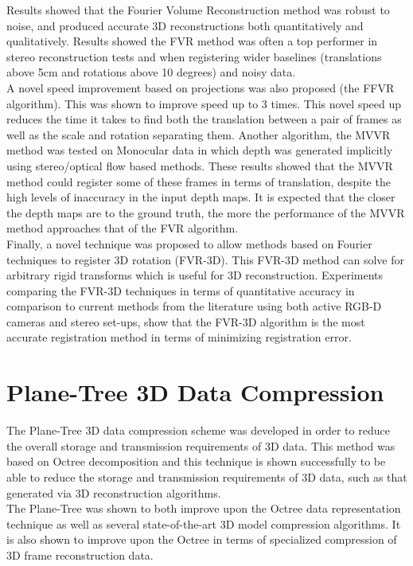 Results showed that the Fourier Volume Reconstruction method was robust to noise, and produced accurate 3D reconstructions both quantitatively and qualitatively. Results showed the FVR method was often a top performer in stereo reconstruction tests and when registering wider baselines (translations above 5cm and rotations above 10 degrees) and noisy data. \\

A novel speed improvement based on projections was also proposed (the FFVR algorithm). This was shown to improve speed up to 3 times. This novel speed up reduces the time it takes to find both the translation between a pair of frames as well as the scale and rotation separating them. Another algorithm, the MVVR method was tested on Monocular data in which depth was generated implicitly using stereo/optical flow based methods. These results showed that the MVVR method could register some of these frames in terms of translation, despite the high levels of inaccuracy in the input depth maps. It is expected that the closer the depth maps are to the ground truth, the more the performance of the MVVR method approaches that of the FVR algorithm. \\

Finally, a novel technique was proposed to allow methods based on Fourier techniques to register 3D rotation (FVR-3D). This FVR-3D method can solve for arbitrary rigid transforms which is useful for 3D reconstruction. Experiments comparing the FVR-3D techniques in terms of quantitative accuracy in comparison to current methods from the literature using both active RGB-D cameras and stereo set-ups, show that the FVR-3D algorithm is the most accurate registration method in terms of minimizing registration error.  \\

\section{Plane-Tree 3D Data Compression}
\label{Sec:ConcPT}

The Plane-Tree 3D data compression scheme was developed in order to reduce the overall storage and transmission requirements of 3D data. This method was based on Octree decomposition and this technique is shown successfully to be able to reduce the storage and transmission requirements of 3D data, such as that generated via 3D reconstruction algorithms. \\

The Plane-Tree was shown to both improve upon the Octree data representation technique as well as several state-of-the-art 3D model compression algorithms. It is also shown to improve upon the Octree in terms of specialized compression of 3D frame reconstruction data. \\

